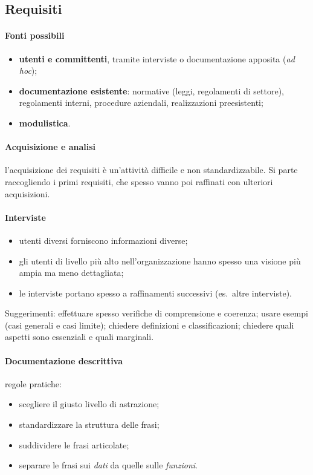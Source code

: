 \documentclass[a4paper,12pt]{article}
\begin{document}
\subsection{Requisiti}

\paragraph{Fonti possibili}
\begin{itemize}
  \item \textbf{utenti e committenti}, tramite interviste o documentazione
    apposita (\emph{ad hoc});
  \item \textbf{documentazione esistente}: normative (leggi, regolamenti di
    settore), regolamenti interni, procedure aziendali, realizzazioni
    preesistenti;
  \item \textbf{modulistica}.
\end{itemize}

\paragraph{Acquisizione e analisi} l'acquisizione dei requisiti è
un'attività difficile e non standardizzabile. Si parte raccogliendo i primi
requisiti, che spesso vanno poi raffinati con ulteriori acquisizioni.

\paragraph{Interviste}
\begin{itemize}
  \item utenti diversi forniscono informazioni diverse;
  \item gli utenti di livello più alto nell'organizzazione hanno spesso una
    visione più ampia ma meno dettagliata;
  \item le interviste portano spesso a raffinamenti successivi (es.\ altre
    interviste).
\end{itemize}
Suggerimenti: effettuare spesso verifiche di comprensione e coerenza; usare
esempi (casi generali e casi limite); chiedere definizioni e classificazioni;
chiedere quali aspetti sono essenziali e quali marginali.

\paragraph{Documentazione descrittiva} regole pratiche:
\begin{itemize}
  \item scegliere il giusto livello di astrazione;
  \item standardizzare la struttura delle frasi;
  \item suddividere le frasi articolate;
  \item separare le frasi sui \emph{dati} da quelle sulle \emph{funzioni}.
\end{itemize}
\end{document}
